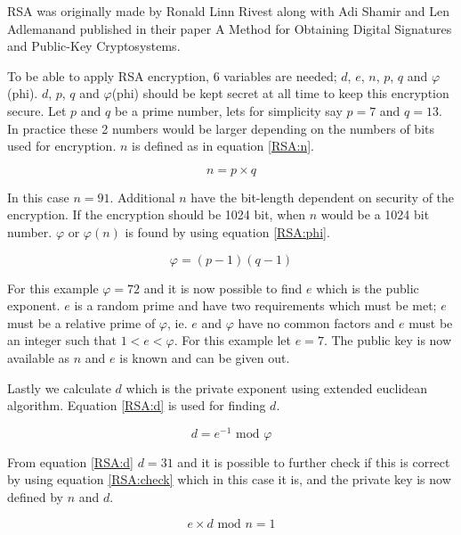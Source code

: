 RSA was originally made by Ronald Linn Rivest along with Adi Shamir and Len Adlemanand published in their paper A Method for Obtaining Digital Signatures and Public-Key Cryptosystems\cite{RSA}.

To be able to apply RSA encryption, 6 variables are needed; $d$, $e$, $n$, $p$, $q$ and $\varphi$(phi). $d$, $p$, $q$ and $\varphi$(phi) should be kept secret at all time to keep this encryption secure. Let $p$ and $q$ be a prime number, lets for simplicity say $p=7$ and $q=13$. In practice these 2 numbers would be larger depending on the numbers of bits used for encryption. $n$ is defined as in equation \ref{RSA:n}.

\begin{equation}
n = p \times q
\label{RSA:n}
\end{equation}

In this case $n=91$. Additional $n$ have the bit-length dependent on security of the encryption. If the encryption should be 1024 bit, when $n$ would be a 1024 bit number. $\varphi$ or $\varphi(n)$ is found by using equation \ref{RSA:phi}.

\begin{equation}
\varphi = (p-1)(q-1)
\label{RSA:phi}
\end{equation}

For this example $\varphi = 72$ and it is now possible to find $e$ which is the public exponent. $e$ is a random prime and have two requirements which must be met; $e$ must be a relative prime of $\varphi$, ie. $e$ and $\varphi$ have no common factors and $e$ must be an integer such that $1 < e < \varphi$. For this example let $e=7$. The public key is now available as $n$ and $e$ is known and can be given out.

Lastly we calculate $d$ which is the private exponent using extended euclidean algorithm. Equation \ref{RSA:d} is used for finding $d$.

\begin{equation}
d = e^{-1} \textrm{ mod } \varphi
\label{RSA:d}
\end{equation}

From equation \ref{RSA:d} $d=31$ and it is possible to further check if this is correct by using equation \ref{RSA:check} which in this case it is, and the private key is now defined by $n$ and $d$.

\begin{equation}
e \times d \textrm{ mod } n = 1
\label{RSA:check}
\end{equation}


